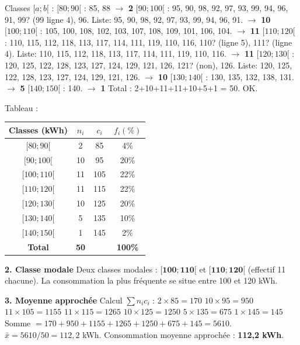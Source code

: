 \documentclass[11pt]{article}
\begin{document}
\begin{exoresolu}
Classes $[a;b[$ :
$[80;90[$ : 85, 88 $\rightarrow$ \textbf{2}
$[90;100[$ : 95, 90, 98, 92, 97, 93, 99, 94, 96, 91, 99? (99 ligne 4), 96. Liste: 95, 90, 98, 92, 97, 93, 99, 94, 96, 91. $\rightarrow$ \textbf{10}
$[100;110[$ : 105, 100, 108, 102, 103, 107, 108, 109, 101, 106, 104. $\rightarrow$ \textbf{11}
$[110;120[$ : 110, 115, 112, 118, 113, 117, 114, 111, 119, 110, 116, 110? (ligne 5), 111? (ligne 4). Liste: 110, 115, 112, 118, 113, 117, 114, 111, 119, 110, 116. $\rightarrow$ \textbf{11}
$[120;130[$ : 120, 125, 122, 128, 123, 127, 124, 129, 121, 126, 121? (non), 126. Liste: 120, 125, 122, 128, 123, 127, 124, 129, 121, 126. $\rightarrow$ \textbf{10}
$[130;140[$ : 130, 135, 132, 138, 131. $\rightarrow$ \textbf{5}
$[140;150[$ : 140. $\rightarrow$ \textbf{1}
Total : 2+10+11+11+10+5+1 = 50. OK.

Tableau :
\begin{center}
\begin{tabular}{|c|c|c|c|}\hline
\textbf{Classes (kWh)} & \textbf{$n_i$} & \textbf{$c_i$} & \textbf{$f_i(\%)$} \\ \hline
$[80 ; 90[$ & 2 & 85 & 4\% \\ \hline
$[90 ; 100[$ & 10 & 95 & 20\% \\ \hline
$[100 ; 110[$ & 11 & 105 & 22\% \\ \hline
$[110 ; 120[$ & 11 & 115 & 22\% \\ \hline
$[120 ; 130[$ & 10 & 125 & 20\% \\ \hline
$[130 ; 140[$ & 5 & 135 & 10\% \\ \hline
$[140 ; 150[$ & 1 & 145 & 2\% \\ \hline
\textbf{Total} & \textbf{50} & & \textbf{100\%} \\ \hline
\end{tabular}
\end{center}

\textbf{2. Classe modale}
Deux classes modales : $\mathbf{[100 ; 110[}$ et $\mathbf{[110 ; 120[}$ (effectif 11 chacune). La consommation la plus fréquente se situe entre 100 et 120 kWh.

\textbf{3. Moyenne approchée}
Calcul $\sum n_i c_i$ :
$2\times85 = 170$
$10\times95 = 950$
$11\times105 = 1155$
$11\times115 = 1265$
$10\times125 = 1250$
$5\times135 = 675$
$1\times145 = 145$
Somme $= 170+950+1155+1265+1250+675+145 = 5610$.
$\bar{x} = 5610 / 50 = 112,2$ kWh.
Consommation moyenne approchée : \textbf{112,2 kWh}.


\end{exoresolu}
\end{document}
